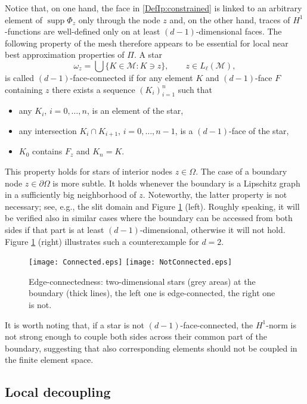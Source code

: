 \documentclass[a4paper]{amsart}
\numberwithin{equation}{section}
\theoremstyle{plain}
\theoremstyle{definition}
\begin{document}
Notice that, on one hand, the face in \eqref{DefIp:constrained} is
linked to an arbitrary element of $\operatorname{supp}{\Phi}_z$ only through the
node $z$ and, on the other hand, traces of ${H^{1}}$-functions are
well-defined only on at least $(d-1)$-dimensional faces.  The
following property of the mesh therefore appears to be essential for
local near best approximation properties of ${\Pi}$.  A star
\[
 \omega_z = \bigcup\{{K}\in{\mathcal{M}} : {K}\ni z\},
\qquad
 z\in{L_{{\ell}}}({\mathcal{M}}),
\]
is called $(d-1)$-face-connected if for any element ${K}$ and $(d-1)$-face
${F}$ containing $z$ there exists a sequence $({K}_i)_{i=1}^n$ such
that
\begin{itemize}
\item any ${K}_i$, $i=0,\dots,n$, is an element of the star,
\item any intersection ${K}_i\cap{K}_{i+1}$,
  $i=0,\dots,n-1$, is a $(d-1)$-face of the star,
\item ${K}_0$ contains ${F}_z$ and ${K}_n={K}$.
\end{itemize}
This property holds for stars of interior nodes $z\in\Omega$.  The case of a 
boundary node $z\in\partial\Omega$ is more subtle.  It holds whenever the 
boundary is a Lipschitz graph in a sufficiently big neighborhood of $z$.  
Noteworthy, the latter property is not necessary; see, e.g., the slit domain 
and Figure \ref{F:edge-connectedness} (left).  Roughly speaking, it will be 
verified also in similar cases where the boundary can be accessed from both 
sides if that part is at least $(d-1)$-dimensional, otherwise it will not hold. 
Figure \ref{F:edge-connectedness} (right) illustrates such a counterexample 
for $d=2$.  
\begin{figure}[h]
 \centering
 \texttt{[image: Connected.eps]}
\qquad\qquad
 \texttt{[image: NotConnected.eps]}
 \caption{Edge-connectedness: two-dimensional stars (grey areas) at the 
boundary (thick lines), the left one is edge-connected, the right one is not.}
 \label{F:edge-connectedness}
\end{figure}
It is worth noting that, if a star is not $(d-1)$-face-connected, the $H^1$-norm 
is not strong enough to couple both sides across their common part of the 
boundary, suggesting that also corresponding elements should not be coupled in 
the finite element space.

\subsection{Local decoupling}
\label{S:ldecoupling}
\end{document}
